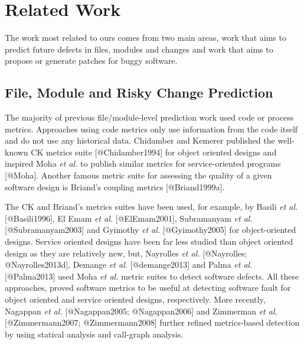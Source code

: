 \section{Related Work}\label{sec:relwork}

The work most related to ours comes from two main areas, work that aims
to predict future defects in files, modules and changes and work that
aims to propose or generate patches for buggy software.

\subsection{File, Module and Risky Change
Prediction}\label{file-module-and-risky-change-prediction}

The majority of previous file/module-level prediction work used code or
process metrics. Approaches using code metrics only use information from
the code itself and do not use any historical data. Chidamber and
Kemerer published the well-known CK metrics suite {[}@Chidamber1994{]}
for object oriented designs and inspired Moha \emph{et al.} to publish
similar metrics for service-oriented programs {[}@Moha{]}. Another
famous metric suite for assessing the quality of a given software design
is Briand's coupling metrics {[}@Briand1999a{]}.

The CK and Briand's metrics suites have been used, for example, by
Basili \emph{et al.} {[}@Basili1996{]}, El Emam \emph{et al.}
{[}@ElEmam2001{]}, Subramanyam \emph{et al.} {[}@Subramanyam2003{]} and
Gyimothy \emph{et al.} {[}@Gyimothy2005{]} for object-oriented designs.
Service oriented designs have been far less studied than object oriented
design as they are relatively new, but, Nayrolles \emph{et al.}
{[}@Nayrolles; @Nayrolles2013d{]}, Demange \emph{et al.}
{[}@demange2013{]} and Palma \emph{et al.} {[}@Palma2013{]} used Moha
\emph{et al.} metric suites to detect software defects. All these
approaches, proved software metrics to be useful at detecting software
fault for object oriented and service oriented designs, respectively.
More recently, Nagappan \emph{et al.} {[}@Nagappan2005; @Nagappan2006{]}
and Zimmerman \emph{et al.} {[}@Zimmermann2007; @Zimmermann2008{]}
further refined metrics-based detection by using statical analysis and
call-graph analysis.

